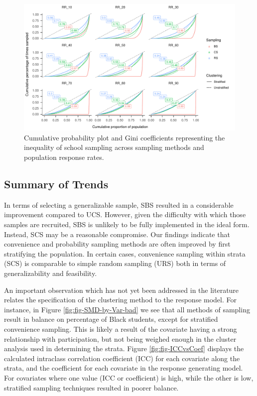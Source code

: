 \documentclass[man,floatsintext]{apa6}
\begin{document}
\begin{figure}
\includegraphics{GenSamp-Paper_files/figure-latex/fig-gini-curve-1} \caption{Cumulative probability plot and Gini coefficients representing the inequality of school sampling across sampling methods and population response rates.}\label{fig:fig-gini-curve}
\end{figure}

\hypertarget{summary-of-trends}{%
\subsection{Summary of Trends}\label{summary-of-trends}}

In terms of selecting a generalizable sample, SBS resulted in a considerable improvement compared to UCS. However, given the difficulty with which those samples are recruited, SBS is unlikely to be fully implemented in the ideal form. Instead, SCS may be a reasonable compromise. Our findings indicate that convenience and probability sampling methods are often improved by first stratifying the population. In certain cases, convenience sampling within strata (SCS) is comparable to simple random sampling (URS) both in terms of generalizability and feasibility.

An important observation which has not yet been addressed in the literature relates the specification of the clustering method to the response model. For instance, in Figure \ref{fig:fig-SMD-by-Var-bad} we see that all methods of sampling result in balance on percentage of Black students, except for stratified convenience sampling. This is likely a result of the covariate having a strong relationship with participation, but not being weighed enough in the cluster analysis used in determining the strata. Figure \ref{fig:fig-ICCvsCoef} displays the calculated intraclass correlation coefficient (ICC) for each covariate along the strata, and the coefficient for each covariate in the response generating model. For covariates where one value (ICC or coefficient) is high, while the other is low, stratified sampling techniques resulted in poorer balance.
\end{document}
